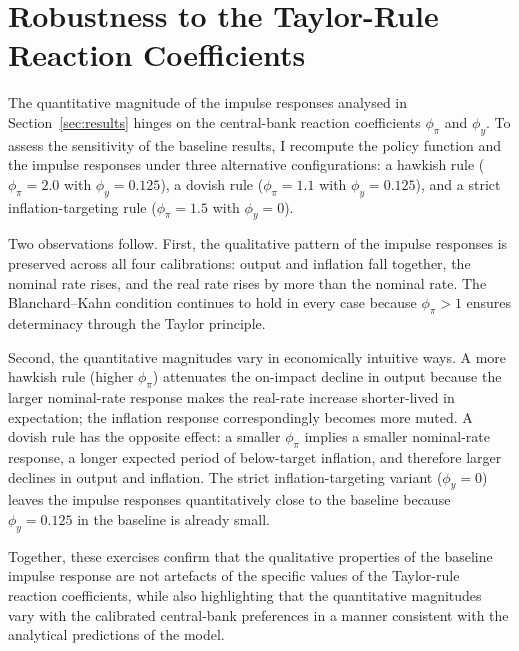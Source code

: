 \section{Robustness to the Taylor-Rule Reaction Coefficients}
\label{sec:robustness}

The quantitative magnitude of the impulse responses analysed in
Section~\ref{sec:results} hinges on the central-bank reaction
coefficients $\phi_{\pi}$ and $\phi_{y}$. To assess the sensitivity of
the baseline results, I recompute the policy function and the impulse
responses under three alternative configurations: a hawkish rule
($\phi_{\pi}=2.0$ with $\phi_{y}=0.125$), a dovish rule
($\phi_{\pi}=1.1$ with $\phi_{y}=0.125$), and a strict
inflation-targeting rule ($\phi_{\pi}=1.5$ with $\phi_{y}=0$).

Two observations follow. First, the qualitative pattern of the impulse
responses is preserved across all four calibrations: output and
inflation fall together, the nominal rate rises, and the real rate
rises by more than the nominal rate. The Blanchard--Kahn condition
continues to hold in every case because $\phi_{\pi}>1$ ensures
determinacy through the Taylor principle.

Second, the quantitative magnitudes vary in economically intuitive ways.
A more hawkish rule (higher $\phi_{\pi}$) attenuates the on-impact
decline in output because the larger nominal-rate response makes the
real-rate increase shorter-lived in expectation; the inflation response
correspondingly becomes more muted. A dovish rule has the opposite
effect: a smaller $\phi_{\pi}$ implies a smaller nominal-rate response,
a longer expected period of below-target inflation, and therefore
larger declines in output and inflation. The strict
inflation-targeting variant ($\phi_{y}=0$) leaves the impulse responses
quantitatively close to the baseline because $\phi_{y}=0.125$ in the
baseline is already small.

Together, these exercises confirm that the qualitative properties of
the baseline impulse response are not artefacts of the specific values
of the Taylor-rule reaction coefficients, while also highlighting that
the quantitative magnitudes vary with the calibrated central-bank
preferences in a manner consistent with the analytical predictions of
the model.
